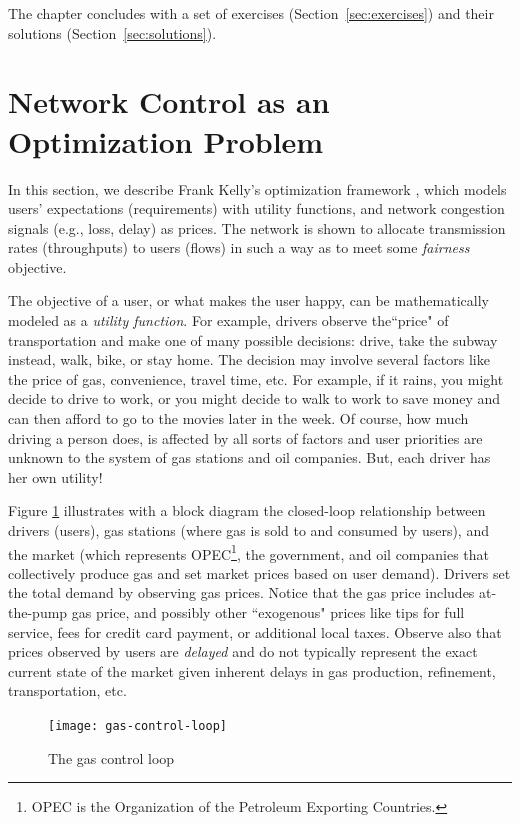 \documentclass{article}
\begin{document}
The chapter concludes with a set of exercises (Section~\ref{sec:exercises})
and their solutions  (Section~\ref{sec:solutions}).

\section{Network Control as an Optimization Problem} 
\label{sec:optimization}

In this section, we describe Frank Kelly's optimization framework \cite{Kelly-2001}, which models users' expectations (requirements) with utility functions, and network congestion signals (e.g., loss, delay) as prices. The network is shown to allocate transmission rates (throughputs) to users (flows) in such a way as to meet some {\em fairness} objective.
 
The objective of a user, or what makes the user happy, can be mathematically modeled as a {\em utility function}. For example, drivers observe the``price" of transportation and make one of many possible decisions: drive, take the subway instead, walk, bike, or stay home. The decision may involve several factors like the price of gas, convenience, travel time, etc. 
For example, if it rains, you might decide to drive to work, or you might decide to walk to work to save money and can then afford to go to the movies later in the week. Of course, how much driving a person does, is affected by all sorts of factors and user priorities are unknown to the system of gas stations and oil companies. But, each driver has her own utility!

Figure \ref{fig:gas-control-loop} illustrates with a block diagram the closed-loop relationship between drivers (users), gas stations (where gas is sold to and consumed by users), and the market (which represents OPEC\footnote{OPEC is the Organization of the Petroleum Exporting Countries.}, the government, and oil companies that collectively produce gas and set market prices based on user demand). Drivers set the total demand by observing gas prices. Notice that the gas price includes at-the-pump gas price, and possibly other ``exogenous" prices like tips for full service, fees for credit card payment, or additional local taxes. Observe also that prices observed by users are {\em delayed} and do not typically represent the exact current state of the market given inherent delays in gas production, refinement, transportation, etc. 

\begin{figure}[htbp] %
   \centering 
   \texttt{[image: gas-control-loop]} 
   \caption{The gas control loop}
   \label{fig:gas-control-loop}
\end{figure}
\end{document}
